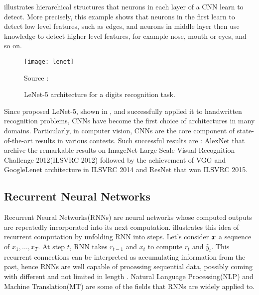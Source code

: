 \addfigure{\ref{fig:conv_intuition}} illustrates hierarchical structures that neurons in each layer of a CNN learn to detect. More precisely, this example shows that neurons in the first learn to detect low level features, such as edges, and neurons in middle layer then use knowledge to detect higher level features, for example nose, mouth or eyes, and so on.


\begin{figure}[!hbt]
    \begin{center}
		\texttt{[image: lenet]}
		\caption{LeNet-5 architecture for a digits recognition task.}
		\label{fig:lenet}
		\small{ Source : \cite{LeCunGradientBasedLearningApplied2001} }
	\end{center}
\end{figure}


Since \cite{LeCunGradientBasedLearningApplied2001} proposed LeNet-5, shown in \addfigure{\ref{fig:lenet}}, and successfully applied it to handwritten recognition problems, CNNs have become the first choice of architectures in many domains. Particularly, in computer vision, CNNs are the core component of state-of-the-art results in various contests. Such successful results are :  AlexNet\cite{KrizhevskyImageNetClassificationDeep2012} that archive the remarkable results on  ImageNet Large-Scale Visual Recognition Challenge 2012(ILSVRC 2012) followed by the achievement of VGG\cite{SimonyanVeryDeepConvolutional2014} and GoogleLenet \cite{SzegedyGoingDeeperConvolutions2014} architecture in ILSVRC 2014 and ResNet\cite{HeDeepResidualLearning2015} that won ILSVRC 2015.



\subsection{Recurrent Neural Networks}
Recurrent Neural Networks(RNNs) are neural networks whose computed outputs   are repeatedly incorporated into its next computation. \addfigure{\ref{fig:rnn_unfold}} illustrates this idea of recurrent computation by unfolding RNN into steps. Let's consider $\boldsymbol{x}$ a sequence of $x_1, \dots, x_T$.  At step $t$, RNN takes $r_{t-1}$ and $x_{t}$ to compute $r_{t}$ and $\hat{y}_t$. This recurrent connections can be interpreted as accumulating information from the past, hence RNNs are well capable of processing sequential data, possibly  coming with different and not limited in length . Natural Language Processing(NLP) and Machine Translation(MT) are some of the fields that RNNs are widely applied to.


